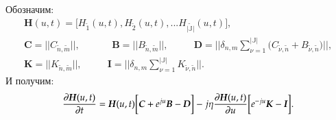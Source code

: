 Обозначим:
\begin{gather*}
	\boldsymbol{H}(u,t) = \bigg[H_{\tilde{1}}(u,t), H_{\tilde{2}}(u,t), ... H_{\tilde{|\mathbb{J}|} }(u,t)\bigg] ,\\
	\boldsymbol{C} = ||C_{\tilde{n},\tilde{m}}||,
	\text{ }\text{ }\text{ }\text{ }\text{ }
	\boldsymbol{B} = ||B_{\tilde{n},\tilde{m}}||,
	\text{ }\text{ }\text{ }\text{ }\boldsymbol{D} = \bigg|\bigg|\delta_{n,m}
	\sum_{\nu = 1}^{|\mathbb{J}|}\bigg(C_{\tilde{\nu},\tilde{n}} + B_{\tilde{\nu},\tilde{n}} \bigg)\bigg|\bigg|, \\
	\boldsymbol{K} = ||K_{\tilde{n},\tilde{m}}||,
	\text{ }\text{ }\text{ }\text{ }\boldsymbol{I} = \bigg|\bigg|\delta_{n,m}
	\sum_{\nu = 1}^{|\mathbb{J}|}K_{\tilde{\nu},\tilde{n}}\bigg|\bigg|.
\end{gather*}
И получим:
\begin{equation}\label{pervoe_uravnenie_partial}
    \pdv{\boldsymbol{H}(u,t)}{t} =
    \boldsymbol{H}(u,t)\bigg[\boldsymbol{C} + e^{ju}\boldsymbol{B} - \boldsymbol{D}\bigg]
    -j\eta\pdv{\boldsymbol{H}(u,t)}{u}\bigg[e^{-ju}\boldsymbol{K} - \boldsymbol{I}\bigg].
\end{equation}
